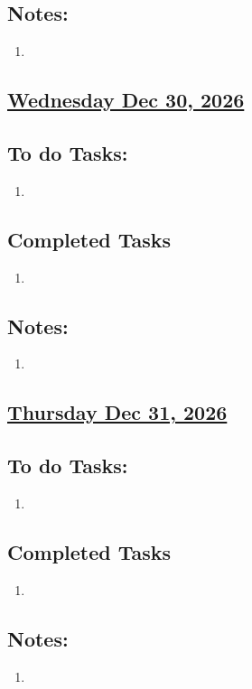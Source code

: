 \subsection*{Notes:}
\begin{enumerate}
    \item 
\end{enumerate}
\subsection*{\underline{Wednesday Dec 30, 2026} }
\subsection*{To do Tasks:}
\begin{enumerate}
    \item 
\end{enumerate}
\subsection*{Completed Tasks}
\begin{enumerate}[\ding{52}]  %
    \item 
\end{enumerate}
\subsection*{Notes:}
\begin{enumerate}
    \item 
\end{enumerate}
\subsection*{\underline{Thursday Dec 31, 2026}}
\subsection*{To do Tasks:}
\begin{enumerate}
    \item
\end{enumerate}
\subsection*{Completed Tasks}
\begin{enumerate}[\ding{52}]  %
    \item 
\end{enumerate}
\subsection*{Notes:}
\begin{enumerate}
    \item 
\end{enumerate}
